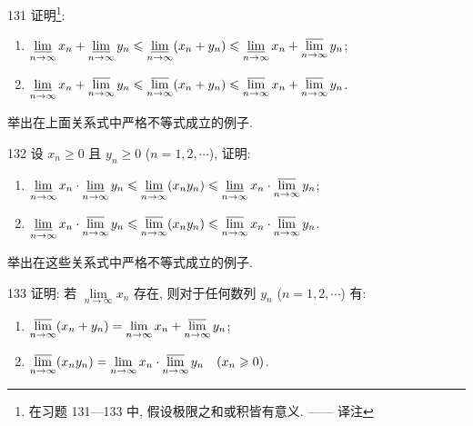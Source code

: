 \begin{prob}[L]{131}
证明\footnote{在习题 131---133 中, 假设极限之和或积皆有意义. —— 译注}:
\begin{enumerate}[label=(\alph*), itemsep=2pt, topsep=3pt]
  \item $\varliminf\limits_{n\to\infty} x_n + \varliminf\limits_{n\to\infty} y_n \leqslant \varliminf\limits_{n\to\infty} (x_n + y_n) \leqslant \varliminf\limits_{n\to\infty} x_n + \varlimsup\limits_{n\to\infty} y_n$;
  \item $\varliminf\limits_{n\to\infty} x_n + \varlimsup\limits_{n\to\infty} y_n \leqslant \varlimsup\limits_{n\to\infty} (x_n + y_n) \leqslant \varlimsup\limits_{n\to\infty} x_n + \varlimsup\limits_{n\to\infty} y_n$.
\end{enumerate}
举出在上面关系式中严格不等式成立的例子.
\end{prob}

\begin{prob}[L]{132}
设 $x_n \geqslant 0$ 且 $y_n \geqslant 0$ ($n = 1, 2, \cdots$), 证明:
\begin{enumerate}[label=(\alph*), itemsep=2pt, topsep=3pt]
  \item $\varliminf\limits_{n\to\infty} x_n \cdot \varliminf\limits_{n\to\infty} y_n \leqslant \varliminf\limits_{n\to\infty} (x_n y_n) \leqslant \varliminf\limits_{n\to\infty} x_n \cdot \varlimsup\limits_{n\to\infty} y_n$;
  \item $\varliminf\limits_{n\to\infty} x_n \cdot \varlimsup\limits_{n\to\infty} y_n \leqslant \varlimsup\limits_{n\to\infty} (x_n y_n) \leqslant \varlimsup\limits_{n\to\infty} x_n \cdot \varlimsup\limits_{n\to\infty} y_n$.
\end{enumerate}
举出在这些关系式中严格不等式成立的例子.
\end{prob}

\begin{prob}[M]{133}
证明: 若 $\lim\limits_{n\to\infty} x_n$ 存在, 则对于任何数列 $y_n$ ($n = 1, 2, \cdots$) 有:
\begin{enumerate}[label=(\alph*), itemsep=2pt, topsep=3pt]
  \item $\varlimsup\limits_{n\to\infty} (x_n + y_n) = \lim\limits_{n\to\infty} x_n + \varlimsup\limits_{n\to\infty} y_n$;
  \item $\varlimsup\limits_{n\to\infty} (x_n y_n) = \lim\limits_{n\to\infty} x_n \cdot \varlimsup\limits_{n\to\infty} y_n \quad (x_n \geqslant 0)$.
\end{enumerate}
\end{prob}

